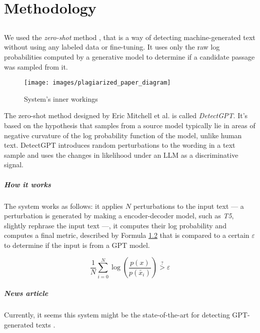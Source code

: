 \chapter{Methodology}

\section{}

We used the \textit{zero-shot} method \cite{mitchell2023detectgpt}, that is  a way of detecting machine-generated text without using any labeled data or fine-tuning. It uses only the raw log probabilities computed by a generative model to determine if a candidate passage was sampled from it.

\begin{figure}[H]
	\centering
	\texttt{[image: images/plagiarized\_paper\_diagram]}
	\caption{System's inner workings}
	\label{fig:plagiarizedpaperdiagram}
\end{figure}

The zero-shot method designed by Eric Mitchell et al. is called \textit{DetectGPT}. It's based on the hypothesis that samples from a source model typically lie in areas of negative curvature of the log probability function of the model, unlike human text. DetectGPT introduces random perturbations to the wording in a text sample and uses the changes in likelihood under an LLM as a discriminative signal.

\paragraph{How it works}
The system works as follows: it applies $N$ perturbations to the input text --- a perturbation is generated by making a encoder-decoder model, such as \textit{T5}, slightly rephrase the input text ---, it computes their log probability and computes a final metric, described by Formula \ref{formula:logprobmetric} that is compared to a certain $\varepsilon$ to determine if the input is from a GPT model.

\begin{figure}[H]
	\centering
	\label{formula:logprobmetric}
	\begin{equation}
		\dfrac{1}{N} \sum_{i = 0}^{N}
		\log\left(
		\dfrac{p(x)}{p(\tilde{x_i})}
		\right)
		\stackrel{?}{>}
		\varepsilon
	\end{equation}
\end{figure}

\paragraph{News article}
Currently, it seems this system might be the state-of-the-art for detecting GPT-generated texts \cite{state-of-the-art-article}.

